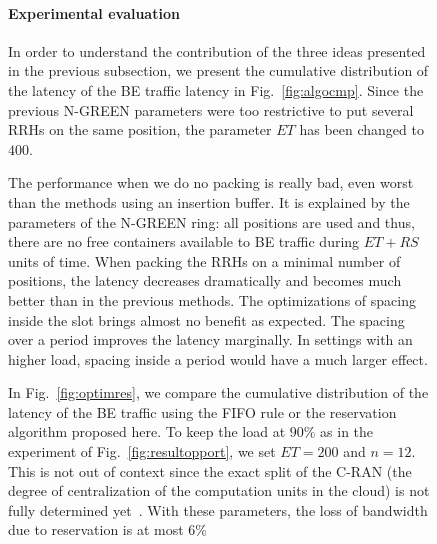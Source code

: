 \documentclass[10pt, conference, letterpaper]{IEEEtran}
\begin{document}
\begin{figure}[h!]
\begin{center}
\begin{minipage}[b]{0.5\linewidth}
\begin{center}
          \label{fig:repart2}
      \end{center} 
  \end{minipage}

  
  \paragraph{Experimental evaluation}

  In order to understand the contribution of the three ideas presented in the previous subsection,
   we present the cumulative distribution of the latency of the BE traffic latency in Fig.~\ref{fig:algocmp}. Since the previous N-GREEN parameters were too restrictive to put several RRHs on the same position, the parameter $ET$ has been changed to $400$.

The performance when we do no packing is really bad, even worst than the methods using an insertion buffer. It is explained by the parameters of the N-GREEN ring: all positions are used and thus, there are no free containers available to BE traffic during $ET+RS$ units of time. When packing the RRHs on a minimal number of positions, the latency decreases dramatically and becomes much better than in the previous methods. The optimizations of spacing inside the slot brings almost no benefit as expected. The spacing over a period improves the latency marginally. In settings with an higher load, spacing inside a period would have a much larger effect.

In Fig.~\ref{fig:optimres}, we compare the cumulative distribution of the latency of the BE traffic using the FIFO rule or the reservation algorithm proposed here. To keep the load at $90\%$ as in the experiment of Fig.~\ref{fig:resultopport}, we set $ET = 200$ and $n = 12$. This is not out of context since the exact split of the C-RAN (the degree of centralization of the computation units in the cloud) is not fully determined yet~\cite{mobile2011c}. With these parameters, the loss of bandwidth due to reservation is at most $6\%$
 


\end{center}
\end{figure}
\end{document}
